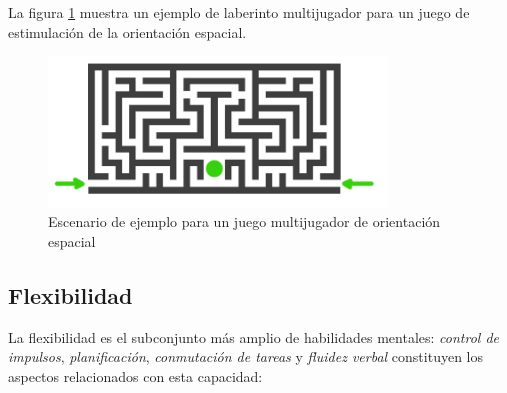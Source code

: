 \begin{itemize}
La figura \ref{fig::spatial-orientation} muestra un ejemplo de laberinto multijugador para un juego de estimulación de la orientación espacial.

\begin{figure}[h]
  \begin{center}
    \includegraphics[width=0.8\textwidth]{./images/game-spatial-orientation.png}
    \caption{Escenario de ejemplo para un juego multijugador de orientación espacial}
    \label{fig::spatial-orientation}
  \end{center}  
\end{figure}


\end{itemize}

\subsection{Flexibilidad}

La flexibilidad es el subconjunto más amplio de habilidades mentales: {\it control de impulsos}, {\it planificación}, {\it conmutación de tareas} y {\it fluidez verbal} constituyen los aspectos relacionados con esta capacidad:

